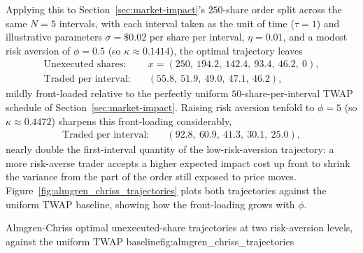 \documentclass[../ai_in_finance]{subfiles}
\begin{document}
Applying this to Section~\ref{sec:market-impact}'s $250$-share order split across the same $N=5$ intervals, with each interval taken as the unit of time ($\tau=1$) and illustrative parameters $\sigma=\$0.02$ per share per interval, $\eta=0.01$, and a modest risk aversion of $\phi=0.5$ (so $\kappa\approx0.1414$), the optimal trajectory leaves
\begin{align*}
\text{Unexecuted shares:} &\quad x=(250,\ 194.2,\ 142.4,\ 93.4,\ 46.2,\ 0), \\
\text{Traded per interval:} &\quad (55.8,\ 51.9,\ 49.0,\ 47.1,\ 46.2),
\end{align*}
mildly front-loaded relative to the perfectly uniform $50$-share-per-interval TWAP schedule of Section~\ref{sec:market-impact}. Raising risk aversion tenfold to $\phi=5$ (so $\kappa\approx0.4472$) sharpens this front-loading considerably,
\begin{align*}
\text{Traded per interval:} &\quad (92.8,\ 60.9,\ 41.3,\ 30.1,\ 25.0),
\end{align*}
nearly double the first-interval quantity of the low-risk-aversion trajectory: a more risk-averse trader accepts a higher expected impact cost up front to shrink the variance from the part of the order still exposed to price moves. Figure~\ref{fig:almgren_chriss_trajectories} plots both trajectories against the uniform TWAP baseline, showing how the front-loading grows with $\phi$.

\begin{bookfigure}[htbp]{Almgren-Chriss optimal unexecuted-share trajectories at two risk-aversion levels, against the uniform TWAP baseline}{fig:almgren_chriss_trajectories}
\end{bookfigure}
\end{document}
